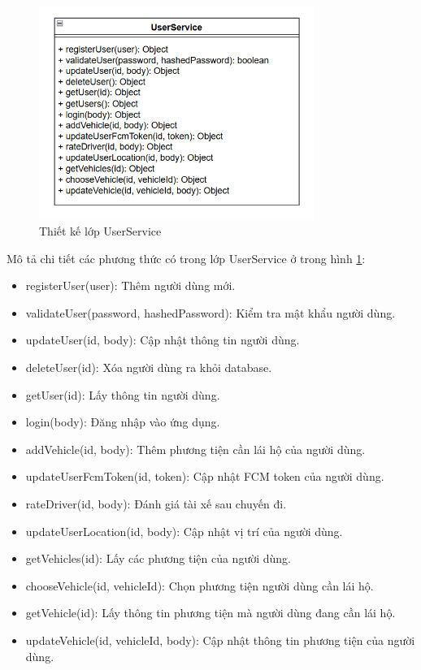 \documentclass[../DoAn.tex]{subfiles}
\begin{document}
\begin{figure}[H]
    \centering
    \includegraphics[width=0.8\textwidth]{Hinhve/Lop_user_service.png}
    \caption{Thiết kế lớp UserService}
    \label{fig:Lop_user_service}
\end{figure}
Mô tả chi tiết các phương thức có trong lớp UserService ở trong hình \ref{fig:Lop_user_service}:
\begin{itemize}
    \item registerUser(user): Thêm người dùng mới.
    \item validateUser(password, hashedPassword): Kiểm tra mật khẩu người dùng.
    \item updateUser(id, body): Cập nhật thông tin người dùng.
    \item deleteUser(id): Xóa người dùng ra khỏi database.
    \item getUser(id): Lấy thông tin người dùng.
    \item login(body): Đăng nhập vào ứng dụng.
    \item addVehicle(id, body): Thêm phương tiện cần lái hộ của người dùng.
    \item updateUserFcmToken(id, token): Cập nhật FCM token của người dùng.
    \item rateDriver(id, body): Đánh giá tài xế sau chuyến đi.
    \item updateUserLocation(id, body): Cập nhật vị trí của người dùng.
    \item getVehicles(id): Lấy các phương tiện của người dùng.
    \item chooseVehicle(id, vehicleId): Chọn phương tiện người dùng cần lái hộ.
    \item getVehicle(id): Lấy thông tin phương tiện mà người dùng đang cần lái hộ.
    \item updateVehicle(id, vehicleId, body): Cập nhật thông tin phương tiện của người dùng.
\end{itemize}
\end{document}
